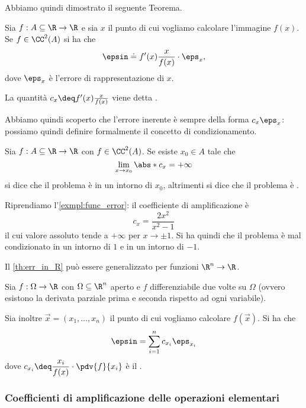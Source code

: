 Abbiamo quindi dimostrato il seguente Teorema.
\begin{theorem}
    \label{th:err_in_R}
    Sia $f : A \subseteq \R \to \R$ e sia $x$ il punto di cui vogliamo calcolare l'immagine $f(x)$. Se $f \in \CC^2(A)$ si ha che \[
        \epsin \doteq f'(x)\frac{x}{f(x)} \cdot \eps_x,
    \] dove $\eps_x$ è l'errore di rappresentazione di $x$.

    La quantità $c_x \deq f'(x)\frac{x}{f(x)}$ viene detta .
\end{theorem}

Abbiamo quindi scoperto che l'errore inerente è sempre della forma $c_x\eps_x$: possiamo quindi definire formalmente il concetto di condizionamento.

\begin{definition}
     Sia $f : A \subseteq \R \to \R$ con $f \in \CC^2(A)$. Se esiste $x_0 \in A$ tale che \[
        \lim_{x \to x_0} \abs*{c_x} = +\infty
    \] si dice che il problema è  in un intorno di $x_0$, altrimenti si dice che il problema è .
\end{definition}

\begin{example}
    Riprendiamo l'\autoref{exmpl:func_error}: il coefficiente di amplificazione è \[
        c_x = \frac{2x^2}{x^2 - 1}
    \] il cui valore assoluto tende a $+\infty$ per $x \to \pm 1$. Si ha quindi che il problema è mal condizionato in un intorno di $1$ e in un intorno di $-1$.  
\end{example}

Il \autoref{th:err_in_R} può essere generalizzato per funzioni $\R^n \to \R$.
\begin{corollary}
    \label{cor:err_in_Rn}
    Sia $f : \Omega \to \R$ con $\Omega \subseteq \R^n$ aperto e $f$ differenziabile due volte su $\Omega$ (ovvero esistono la derivata parziale prima e seconda rispetto ad ogni variabile). 
    
    Sia inoltre $\vec{x} = (x_1, \dots, x_n)$ il punto di cui vogliamo calcolare $f(\vec{x})$. Si ha che \[
        \epsin = \sum_{i=1}^n c_{x_i}\eps_{x_i}
    \] dove $\displaystyle c_{x_i} \deq \frac{x_i}{f(x)} \cdot \pdv{f}{x_i}$ è il . 
\end{corollary}

\subsubsection{Coefficienti di amplificazione delle operazioni elementari}

